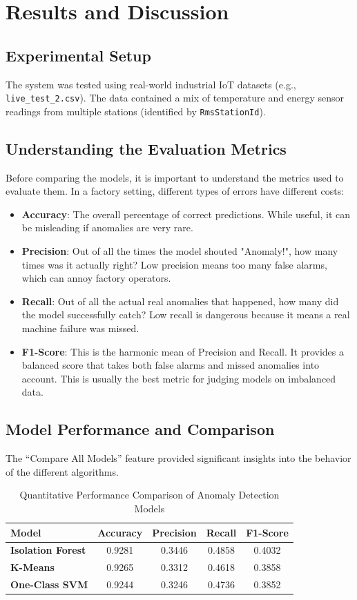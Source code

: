 \chapter{Results and Discussion}

\section{Experimental Setup}
The system was tested using real-world industrial IoT datasets (e.g., \texttt{live\_test\_2.csv}). The data contained a mix of temperature and energy sensor readings from multiple stations (identified by \texttt{RmsStationId}).

\section{Understanding the Evaluation Metrics}
Before comparing the models, it is important to understand the metrics used to evaluate them. In a factory setting, different types of errors have different costs:
\begin{itemize}
    \item \textbf{Accuracy}: The overall percentage of correct predictions. While useful, it can be misleading if anomalies are very rare.
    \item \textbf{Precision}: Out of all the times the model shouted "Anomaly!", how many times was it actually right? Low precision means too many false alarms, which can annoy factory operators.
    \item \textbf{Recall}: Out of all the actual real anomalies that happened, how many did the model successfully catch? Low recall is dangerous because it means a real machine failure was missed.
    \item \textbf{F1-Score}: This is the harmonic mean of Precision and Recall. It provides a balanced score that takes both false alarms and missed anomalies into account. This is usually the best metric for judging models on imbalanced data.
\end{itemize}

\section{Model Performance and Comparison}
The ``Compare All Models'' feature provided significant insights into the behavior of the different algorithms.

\begin{table}[!ht]
\centering
\caption{Quantitative Performance Comparison of Anomaly Detection Models}
\begin{tabular}{@{}lcccc@{}}
\toprule
Model & Accuracy & Precision & Recall & F1-Score \\ \midrule
\textbf{Isolation Forest} & 0.9281 & 0.3446 & 0.4858 & 0.4032 \\
\textbf{K-Means} & 0.9265 & 0.3312 & 0.4618 & 0.3858 \\
\textbf{One-Class SVM} & 0.9244 & 0.3246 & 0.4736 & 0.3852 \\ \bottomrule
\end{tabular}
\end{table}

